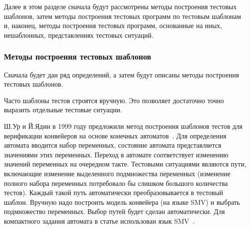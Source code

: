 Далее в этом разделе сначала будут рассмотрены методы построения тестовых шаблонов, затем методы построения тестовых программ по тестовым шаблонам и, наконец, методы построения тестовых программ, основанные на иных, нешаблонных, представлениях тестовых ситуаций.


\subsubsection{Методы построения тестовых шаблонов}%

Сначала будет дан ряд определений, а затем будут описаны методы построения тестовых шаблонов.


Часто шаблоны тестов строятся вручную. Это позволяет достаточно точно выразить отдельные тестовые ситуации.

Ш.Ур и Й.Ядин в 1999 году предложили метод построения шаблонов тестов для верификации конвейеров на основе конечных автоматов~\cite{UrFSM}. Для определения автомата вводится набор переменных, состояние автомата представляется значениями этих переменных. Переход в автомате соответствует изменению значений переменных на очередном такте. Тестовыми ситуациями являются пути, включающие изменение выделенного подмножества переменных (изменение полного набора переменных потребовало бы слишком большого количества тестов). Каждый такой путь автоматически преобразовывается в тестовый шаблон. Вручную надо построить модель конвейера (на языке SMV) и выбрать подмножество переменных. Выбор путей будет сделан автоматически. Для компактного задания автомата в статье использован язык SMV~\cite{SMV}.

